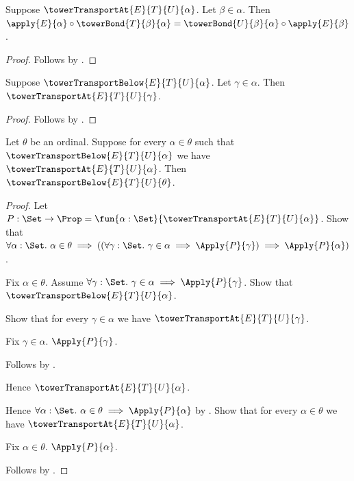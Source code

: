 \begin{proposition}\label{tower_transport_at_strict_square}
    Suppose $\towerTransportAt{E}{T}{U}{\alpha}$.
    Let $\beta\in\alpha$.
    Then $\apply{E}{\alpha}\circ\towerBond{T}{\beta}{\alpha}=
        \towerBond{U}{\beta}{\alpha}\circ\apply{E}{\beta}$.
\end{proposition}
\begin{proof}
    Follows by .
\end{proof}

\begin{proposition}\label{tower_transport_below_at}
    Suppose $\towerTransportBelow{E}{T}{U}{\alpha}$.
    Let $\gamma\in\alpha$.
    Then $\towerTransportAt{E}{T}{U}{\gamma}$.
\end{proposition}
\begin{proof}
    Follows by .
\end{proof}

\begin{theorem}\label{tower_transport_bounded_induction}
    Let $\theta$ be an ordinal.
    Suppose for every $\alpha\in\theta$ such that
        $\towerTransportBelow{E}{T}{U}{\alpha}$ we have
        $\towerTransportAt{E}{T}{U}{\alpha}$.
    Then $\towerTransportBelow{E}{T}{U}{\theta}$.
\end{theorem}
\begin{proof}
    Let $P:\Set\to\Prop=\fun{\alpha:\Set}{
        \towerTransportAt{E}{T}{U}{\alpha}}$.
    Show that $\forall \alpha:\Set.\ \alpha\in\theta\implies
        ((\forall \gamma:\Set.\ \gamma\in\alpha\implies
            \Apply{P}{\gamma})
        \implies\Apply{P}{\alpha})$.
    \begin{subproof}
        Fix $\alpha\in\theta$.
        Assume $\forall \gamma:\Set.\ \gamma\in\alpha\implies
            \Apply{P}{\gamma}$.
        Show that $\towerTransportBelow{E}{T}{U}{\alpha}$.
        \begin{subproof}
            Show that for every $\gamma\in\alpha$ we have
                $\towerTransportAt{E}{T}{U}{\gamma}$.
            \begin{subproof}
                Fix $\gamma\in\alpha$.
                $\Apply{P}{\gamma}$.
            \end{subproof}
            Follows by .
        \end{subproof}
        Hence $\towerTransportAt{E}{T}{U}{\alpha}$.
    \end{subproof}
    Hence $\forall \alpha:\Set.\ \alpha\in\theta\implies
        \Apply{P}{\alpha}$ by
        .
    Show that for every $\alpha\in\theta$ we have
        $\towerTransportAt{E}{T}{U}{\alpha}$.
    \begin{subproof}
        Fix $\alpha\in\theta$.
        $\Apply{P}{\alpha}$.
    \end{subproof}
    Follows by .
\end{proof}

